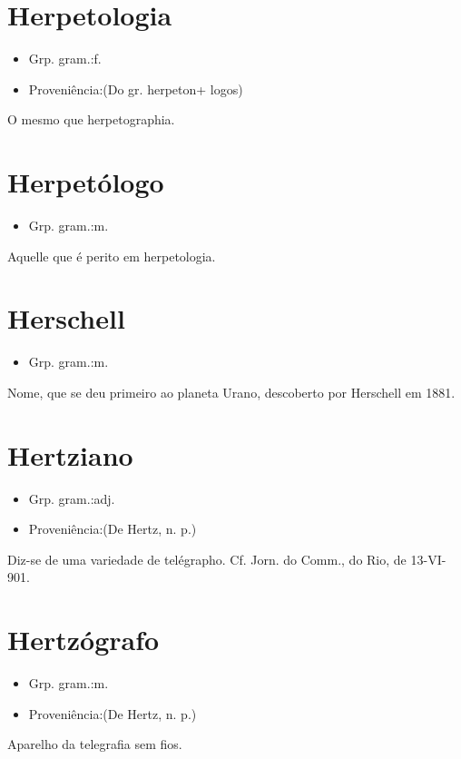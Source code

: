 \documentclass{article}
\begin{document}
\section{Herpetologia}
\begin{itemize}
\item {Grp. gram.:f.}
\end{itemize}
\begin{itemize}
\item {Proveniência:(Do gr. \textunderscore herpeton\textunderscore  + \textunderscore logos\textunderscore )}
\end{itemize}
O mesmo que \textunderscore herpetographia\textunderscore .
\section{Herpetólogo}
\begin{itemize}
\item {Grp. gram.:m.}
\end{itemize}
Aquelle que é perito em herpetologia.
\section{Herschell}
\begin{itemize}
\item {Grp. gram.:m.}
\end{itemize}
Nome, que se deu primeiro ao planeta Urano, descoberto por Herschell em 1881.
\section{Hertziano}
\begin{itemize}
\item {Grp. gram.:adj.}
\end{itemize}
\begin{itemize}
\item {Proveniência:(De \textunderscore Hertz\textunderscore , n. p.)}
\end{itemize}
Diz-se de uma variedade de telégrapho. Cf. \textunderscore Jorn. do Comm.\textunderscore , do Rio, de 13-VI-901.
\section{Hertzógrafo}
\begin{itemize}
\item {Grp. gram.:m.}
\end{itemize}
\begin{itemize}
\item {Proveniência:(De \textunderscore Hertz\textunderscore , n. p.)}
\end{itemize}
Aparelho da telegrafia sem fios.
\end{document}
